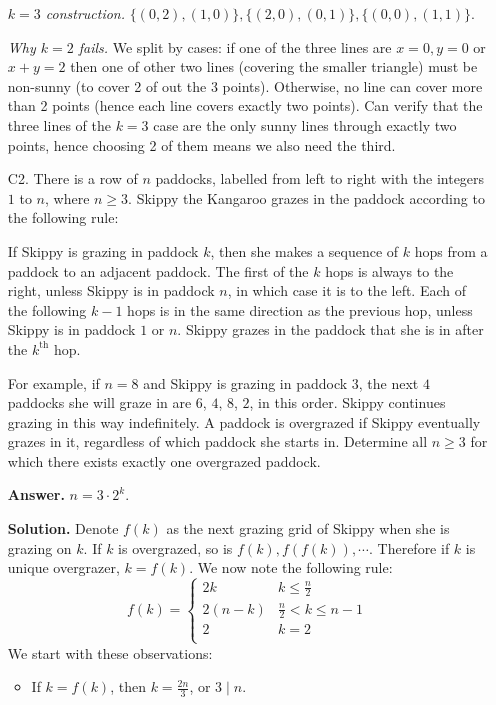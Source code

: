 \documentclass[11pt,a4paper]{article}
\begin{document}
\begin{enumerate}
    	\textit{$k=3$ construction.} $\{(0, 2), (1, 0)\}, \{(2, 0), (0, 1)\}, \{(0, 0), (1, 1)\}$. 
    	
    	\textit{Why $k=2$ fails.} We split by cases: if one of the three lines are $x=0, y=0$ or $x+y=2$ then one of other two lines (covering the smaller triangle) must be non-sunny (to cover 2 of out the 3 points). 
    	Otherwise, no line can cover more than 2 points (hence each line covers exactly two points). 
    	Can verify that the three lines of the $k=3$ case are the only sunny lines through exactly two points, 
    	hence choosing 2 of them means we also need the third. 
    	
    	
    	\item [C2.]
    	There is a row of $n$ paddocks, labelled from left to right with the integers $1$ to $n$, where $n\geq 3$. Skippy the Kangaroo grazes in the paddock according to the following rule:
    	
    	If Skippy is grazing in paddock $k$, then she makes a sequence of $k$ hops from a paddock to an adjacent paddock. The first of the $k$ hops is always to the right, unless Skippy is in paddock $n$, in which case it is to the left. Each of the following $k-1$ hops is in the same direction as the previous hop, unless Skippy is in paddock $1$ or $n$. Skippy grazes in the paddock that she is in after the $k^{\text{th}}$ hop.
    	
    	For example, if $n=8$ and Skippy is grazing in paddock $3$, the next $4$ paddocks she will graze in are $6$, $4$, $8$, $2$, in this order. Skippy continues grazing in this way indefinitely. A paddock is overgrazed if Skippy eventually grazes in it, regardless of which paddock she starts in. Determine all $n\geq 3$ for which there exists exactly one overgrazed paddock.
    	
    	\textbf{Answer.} $n=3\cdot 2^k$. 
    	
    	\textbf{Solution.} Denote $f(k)$ as the next grazing grid of Skippy when she is grazing on $k$. If $k$ is overgrazed, so is $f(k), f(f(k)), \cdots$. Therefore if $k$ is unique overgrazer, $k=f(k)$. 
    	We now note the following rule:
    	\[
    	f(k) = 
    	\begin{cases}
    		2k & k \le \frac{n}{2}\\
    		2(n-k) & \frac{n}{2} < k \le n - 1\\
    		2 & k = 2\\
    	\end{cases}
    	\]
    	We start with these observations: 
    	\begin{itemize}
    		\item If $k = f(k)$, then $k = \frac{2n}{3}$, or $3\mid n$. 
    		

\end{itemize}
\end{enumerate}
\end{document}

